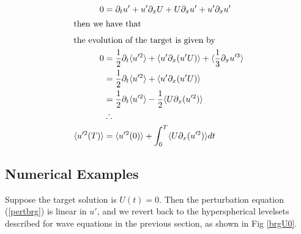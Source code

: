 \documentclass[longbibliography,twocolumn,amsmath,amssymb,aps,nofootinbib]{revtex4-2}
\newcommand{\davg}[1]{\langle {#1} \rangle}
\begin{document}
\begin{align}
  0 &= \partial_t u' + u'\partial_x U + U\partial_x u' + u'\partial_x u' \label{pertbrg}\\
  \intertext{then we have that}
  \intertext{the evolution of the target is given by}
  0 &= \frac{1}{2}\partial_t \davg{u'^2} + \davg{u' \partial_x (u'U)} + \davg{\frac{1}{3}\partial_x u'^3} \nonumber \\
  &= \frac{1}{2}\partial_t \davg{u'^2} + \davg{u' \partial_x (u'U)} \nonumber \\
  &= \frac{1}{2}\partial_t \davg{u'^2} - \frac{1}{2}\davg{U \partial_x (u'^2)} \nonumber \\
  &\therefore\nonumber\\
  \davg{u'^2(T)} &= \davg{u'^2(0)} + \int_0^T \davg{U \partial_x (u'^2)} dt \label{objburgeq}
\end{align}

\subsection*{Numerical Examples}
Suppose the target solution is $U(t) = 0$. Then the perturbation equation (\ref{pertbrg}) is linear in $u'$, and we revert back to the hyperspherical levelsets described for wave equations in the previous section, as shown in Fig \ref{brgU0}.
\end{document}
